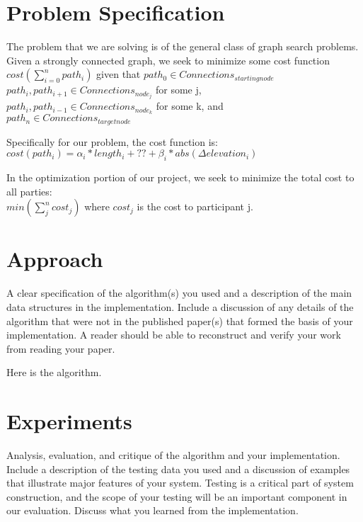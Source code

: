 \documentclass[11pt]{article}
\begin{document}
\section{Problem Specification}

The problem that we are solving is of the general class of graph search problems. Given a strongly connected graph, we seek to minimize some cost function $cost(\sum_{i=0}^n path_i)$ given that  $path_0 \in Connections_{starting node}$ \\$path_i, path_{i+1} \in Connections_{node_j}$ for some j, \\$path_i, path_{i-1} \in Connections_{node_k}$ for some k, and \\$path_n \in Connections_{target node}$

Specifically for our problem, the cost function is:\\
$cost(path_i)= \alpha_i * length_i + ?? + \beta_i * abs(\Delta elevation_i)$

In the optimization portion of our project, we seek to minimize the total cost to all parties:\\
$min(\sum_j^n cost_j)$ where  $cost_j$ is the cost to participant j.

\section{Approach}

A clear specification of the algorithm(s) you used and a description
of the main data structures in the implementation. Include a
discussion of any details of the algorithm that were not in the
published paper(s) that formed the basis of your implementation. A
reader should be able to reconstruct and verify your work from reading
your paper.

\begin{algorithm}
  \begin{algorithmic}
    \EndProcedure{}
  \end{algorithmic}
  \caption{Here is the algorithm.}
\end{algorithm}



\section{Experiments}
Analysis, evaluation, and critique of the algorithm and your
implementation. Include a description of the testing data you used and
a discussion of examples that illustrate major features of your
system. Testing is a critical part of system construction, and the
scope of your testing will be an important component in our
evaluation. Discuss what you learned from the implementation.
\end{document}
